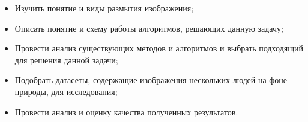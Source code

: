 \begin{itemize}[left=0.49cm]
    \item Изучить понятие и виды размытия изображения;
    \item Описать понятие и схему работы алгоритмов, решающих данную задачу;
    \item Провести анализ существующих методов и алгоритмов и выбрать подходящий для решения данной задачи;
    \item Подобрать датасеты, содержащие изображения нескольких людей на фоне природы, для исследования;
    \item Провести анализ и оценку качества полученных результатов.
\end{itemize}


